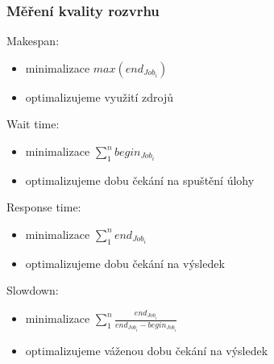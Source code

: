 \documentclass[pdftex,fleqn,aspectratio=169]{beamer}
\begin{document}
\begin{frame}
	\frametitle{Měření kvality rozvrhu}
	Makespan:
	\begin{itemize}
		\item minimalizace $max(end_{Job_i})$
		\item optimalizujeme využití zdrojů
	\end{itemize}\pause
	
	Wait time:
	\begin{itemize}
		\item minimalizace $\sum_1^n begin_{Job_i}$
		\item optimalizujeme dobu čekání na spuštění úlohy
	\end{itemize}\pause

	Response time:
	\begin{itemize}
		\item minimalizace $\sum_1^n end_{Job_i}$
		\item optimalizujeme dobu čekání na výsledek
	\end{itemize}\pause
	
	Slowdown:
	\begin{itemize}
		\item minimalizace $\sum_1^n \frac{end_{Job_i}}{end_{Job_i}-begin_{Job_i}}$
		\item optimalizujeme váženou dobu čekání na výsledek
	\end{itemize}
\end{frame}
\end{document}
